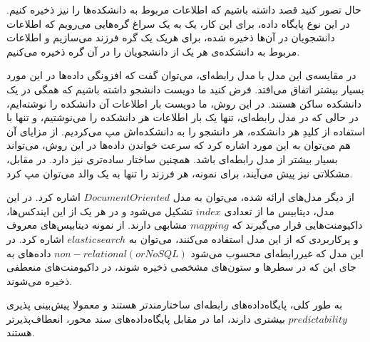 حال تصور کنید قصد داشته باشیم که اطلاعات مربوط به دانشکده‌ها را نیز ذخیره کنیم.
در این نوع پایگاه داده، برای این کار، یک به یک سراغ گره‌هایی می‌رویم که اطلاعات دانشجویان در آن‌ها ذخیره شده، برای هریک یک گره فرزند می‌سازیم و اطلاعات مربوط به دانشکده‌ی هر یک از دانشجویان را در آن گره ذخیره می‌کنیم.

در مقایسه‌ی این مدل با مدل رابطه‌ای، می‌توان گفت که افزونگی داده‌ها در این مورد بسیار بیشتر اتفاق می‌افتد.
 فرض کنید ما دویست دانشجو داشته باشیم که همگی در یک دانشکده ساکن هستند. در این روش، ما دویست بار اطلاعات آن دانشکده را نوشته‌ایم، در حالی که در مدل رابطه‌ای، تنها یک بار اطلاعات هر دانشکده را می‌نوشتیم، 
 و تنها با استفاده از کلیدِ هر دانشکده، هر دانشجو را به دانشکده‌اش مپ می‌کردیم.
از مزایای آن هم می‌توان به این مورد اشاره کرد که سرعت خواندن داده‌ها در این روش، می‌تواند بسیار بیشتر از مدل رابطه‌ای باشد. همچنین ساختار ساده‌تری نیز دارد.
در مقابل، مشکلاتی نیز پیش می‌آیند، برای نمونه، هر فرزند را تنها به یک والد می‌توان مپ کرد.


از دیگر مدل‌های ارائه شده، می‌توان به مدل 
$Document Oriented$
اشاره کرد.
در این مدل، دیتابیس ما از تعدادی 
$index$
تشکیل می‌شود و در هر یک از این ایندکس‌ها، داکیومنت‌هایی قرار می‌گیرند که 
$mapping$
مشابهی دارند. از نمونه دیتابیس‌های معروف و پرکاربردی که از این مدل استفاده می‌کنند، می‌توان به 
$elasticsearch$
اشاره کرد.
در این مدل که غیررابطه‌ای محسوب می‌شود 
$non-relational (or NoSQL)$
 داده‌های به جای این که در سطرها و ستون‌های مشخصی ذخیره شوند، در داکیومنت‌های منعطفی ذخیره می‌شوند.
 
به طور کلی، پایگاه‌داده‌های رابطه‌ای ساختارمند‌تر هستند و معمولا پیش‌بینی پذیری
$predictability$
بیشتری دارند، اما در مقابل پایگاه‌داده‌های سند محور، انعطاف‌پذیرتر هستند.
